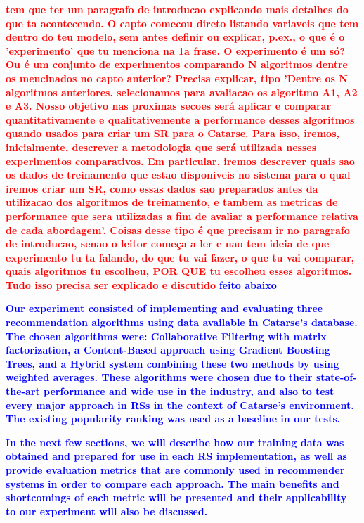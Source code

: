 \documentclass[cic,tc,english]{iiufrgs}
\newcommand{\bruno}[1]{\textcolor{red}{\textbf{#1}}}
\newcommand{\adriano}[1]{\textcolor{blue}{\textbf{#1}}}
\begin{document}
\bruno{tem que ter um paragrafo de introducao explicando mais detalhes do que ta acontecendo. O capto comecou direto listando variaveis que tem dentro do teu modelo, sem antes definir ou explicar, p.ex., o que é o 'experimento' que tu menciona na 1a frase. O experimento é um só? Ou é um conjunto de experimentos comparando N algoritmos dentre os mencinados no capto anterior? Precisa explicar, tipo 'Dentre os N algoritmos anteriores, selecionamos para avaliacao os algoritmo A1, A2 e A3. Nosso objetivo nas proximas secoes será aplicar e comparar quantitativamente e qualitativemente a performance desses algoritmos quando usados para criar um SR para o Catarse. Para isso, iremos, inicialmente, descrever a metodologia que será utilizada nesses experimentos comparativos. Em particular, iremos descrever quais sao os dados de treinamento que estao disponiveis no sistema para o qual iremos criar um SR, como essas dados sao preparados antes da utilizacao dos algoritmos de treinamento, e tambem as metricas de performance que sera utilizadas a fim de avaliar a performance relativa de cada abordagem'. Coisas desse tipo é que precisam ir no paragrafo de introducao, senao o leitor começa a ler e nao tem ideia de que experimento tu ta falando, do que tu vai fazer, o que tu vai comparar, quais algoritmos tu escolheu, POR QUE tu escolheu esses algoritmos. Tudo isso precisa ser explicado e discutido} \adriano{feito abaixo}

\adriano{Our experiment consisted of implementing and evaluating three recommendation algorithms using data available in Catarse's database. The chosen algorithms were: Collaborative Filtering with matrix factorization, a Content-Based approach using Gradient Boosting Trees, and a Hybrid system combining these two methods by using weighted averages. These algorithms were chosen due to their state-of-the-art performance and wide use in the industry, and also to test every major approach in RSs in the context of Catarse's environment. The existing popularity ranking was used as a baseline in our tests.}

\adriano{In the next few sections, we will describe how our training data was obtained and prepared for use in each RS implementation, as well as provide evaluation metrics that are commonly used in recommender systems in order to compare each approach. The main benefits and shortcomings of each metric will be presented and their applicability to our experiment will also be discussed.}
\end{document}

